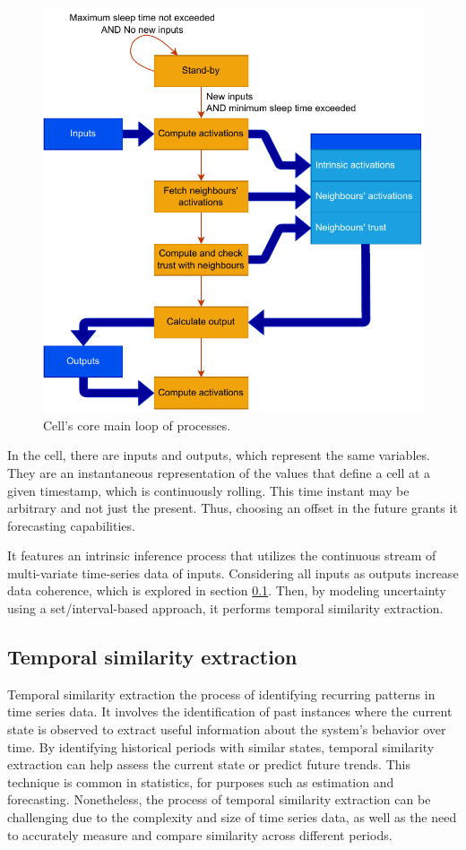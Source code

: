 \begin{figure}[h!]
    \centering
    \includegraphics[width=12cm]{figures/chapter4/cell/processes.pdf}
    \caption{Cell's core main loop of processes.}
    \label{fig:cellprocesses}
\end{figure}


In the cell, there are inputs and outputs, which represent the same variables. They are an instantaneous representation of the values that define a cell at a given timestamp, which is continuously rolling. This time instant may be arbitrary and not just the present. Thus, choosing an offset in the future grants it forecasting capabilities.

It features an intrinsic inference process that utilizes the continuous stream of multi-variate time-series data of inputs. Considering all inputs as outputs increase data coherence, which is explored in section \ref{subsec:tempsim}. Then, by modeling uncertainty using a set/interval-based approach, it performs temporal similarity extraction.

\subsection{Temporal similarity extraction} \label{subsec:tempsim}

Temporal similarity extraction the process of identifying recurring patterns in time series data. It involves the identification of past instances where the current state is observed to extract useful information about the system's behavior over time. By identifying historical periods with similar states, temporal similarity extraction can help assess the current state or predict future trends. This technique is common in statistics, for purposes such as estimation and forecasting. Nonetheless, the process of temporal similarity extraction can be challenging due to the complexity and size of time series data, as well as the need to accurately measure and compare similarity across different periods.

